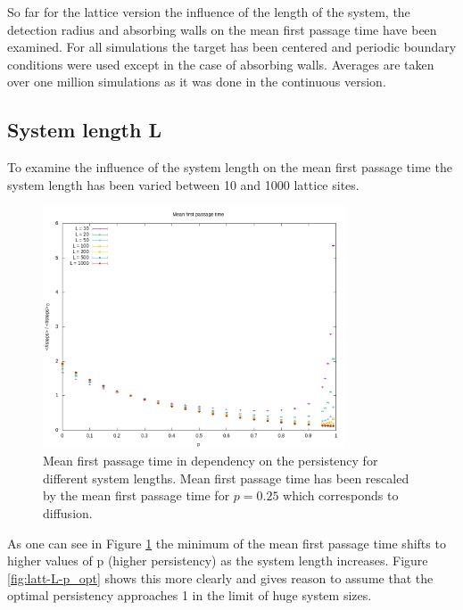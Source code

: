 \documentclass[]{scrartcl}
\begin{document}
So far for the lattice version the influence of the length of the system, the detection radius and absorbing walls on the mean first passage time have been examined. For all simulations the target has been centered and periodic boundary conditions were used except in the case of absorbing walls. Averages are taken over one million simulations as it was done in the continuous version.


\subsection{System length L}
\label{ssec:latt-L}

To examine the influence of the system length on the mean first passage time the system length has been varied between 10 and 1000 lattice sites.

\begin{figure}[!hbt]
 \centering
 \includegraphics[width=0.8\textwidth]{./fig/latt/L/fpt.png}
 \caption{Mean first passage time in dependency on the persistency for different system lengths. Mean first passage time has been rescaled by the mean first passage time for $p = 0.25$ which corresponds to diffusion.}\label{fig:latt-L-fpt}
\end{figure}

As one can see in Figure \ref{fig:latt-L-fpt} the minimum of the mean first passage time shifts to higher values of p (higher persistency) as the system length increases. Figure \ref{fig:latt-L-p_opt} shows this more clearly and gives reason to assume that the optimal persistency approaches 1 in the limit of huge system sizes.
\end{document}
